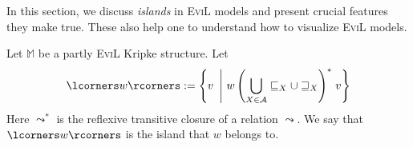 In this section, we discuss \emph{islands} in \textsc{EviL} models and
present crucial features they make true.  These also help one to
understand how to visualize \textsc{EviL} models.


\begin{mydef}Let $\mathbb{M}$ be a partly \textsc{EviL} Kripke structure.  Let
\[ \lcorners w\rcorners := \left\{ v\ \left|\ w \left(\bigcup_{X \in
        \mathcal{A}}\sqsubseteq_X \cup \sqsupseteq_X\right)^\ast\right. v
     \right\}\]
Here $\leadsto^\ast$ is the reflexive transitive closure of a relation
$\leadsto$.  We say that $\lcorners w \rcorners$ is the island that
$w$ belongs to.
\end{mydef}

